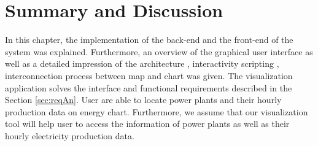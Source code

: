 \section{Summary and Discussion}

In this chapter, the implementation of the back-end and the front-end of the system was explained.
Furthermore, an overview of the graphical user interface as well as a detailed impression of
the architecture , interactivity scripting , interconnection process between map and chart was given. The visualization application solves the interface and functional requirements described in the Section \ref{sec:reqAn}. User are able to locate power plants and their hourly production data on energy chart. Furthermore, we assume that our visualization tool will help user to access the information of power plants as well as their hourly electricity production data. 
